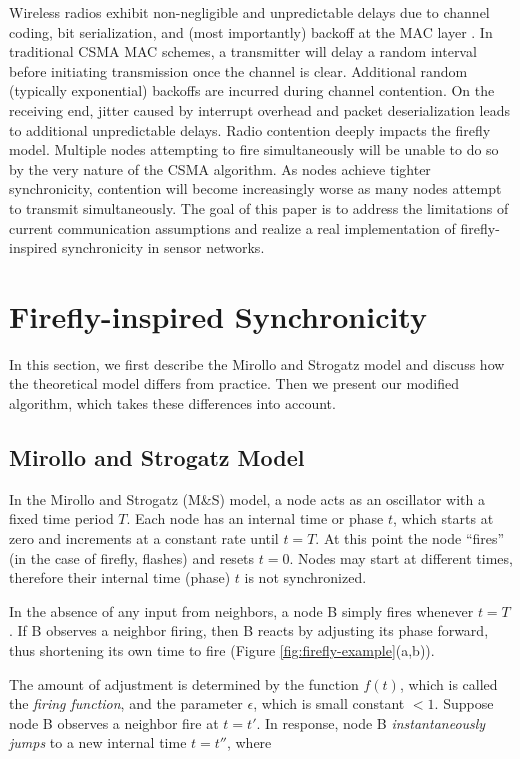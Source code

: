 \documentclass{sig-alternate}
\begin{document}
Wireless radios exhibit non-negligible and unpredictable delays due to
channel coding, bit serialization, and (most importantly) backoff at
the MAC layer \cite{tpsn,ftsp}. In traditional CSMA MAC schemes, a
transmitter will delay a random interval before initiating
transmission once the channel is clear. Additional random (typically
exponential) backoffs are incurred during channel contention.  On the
receiving end, jitter caused by interrupt overhead and packet
deserialization leads to additional unpredictable delays.  Radio
contention deeply impacts the firefly model.  Multiple nodes
attempting to fire simultaneously will be unable to do so by the very
nature of the CSMA algorithm. As nodes achieve tighter synchronicity,
contention will become increasingly worse as many nodes attempt to
transmit simultaneously. The goal of this paper is to address the
limitations of current communication assumptions and realize a real
implementation of firefly-inspired synchronicity in sensor networks.

\section{Firefly-inspired Synchronicity}
\label{sec-algorithm}

In this section, we first describe the Mirollo and Strogatz model and
discuss how the theoretical model differs from practice. Then we
present our modified algorithm, which takes these differences into
account.

\subsection{Mirollo and Strogatz Model}
\label{sec:strogatz}

In the Mirollo and Strogatz (M\&S) model, a node acts as an oscillator
with a fixed time period $T$. Each node has an internal time or phase
$t$, which starts at zero and increments at a constant rate until
$t=T$. At this point the node ``fires'' (in the case of firefly,
flashes) and resets $t=0$. Nodes may start at different times,
therefore their internal time (phase) $t$ is not synchronized.

In the absence of any input from neighbors, a node B simply fires
whenever $t=T$. If B observes a neighbor firing, then B reacts by
adjusting its phase forward, thus shortening its own time to fire
(Figure \ref{fig:firefly-example}(a,b)).

The amount of adjustment is determined by the function $f(t)$, which
is called the {\em firing function}, and the parameter $\epsilon$,
which is small constant $< 1$. Suppose node B observes a neighbor
fire at $t=t'$. In response, node B {\em instantaneously jumps} to a
new internal time $t = t''$, where
\end{document}
